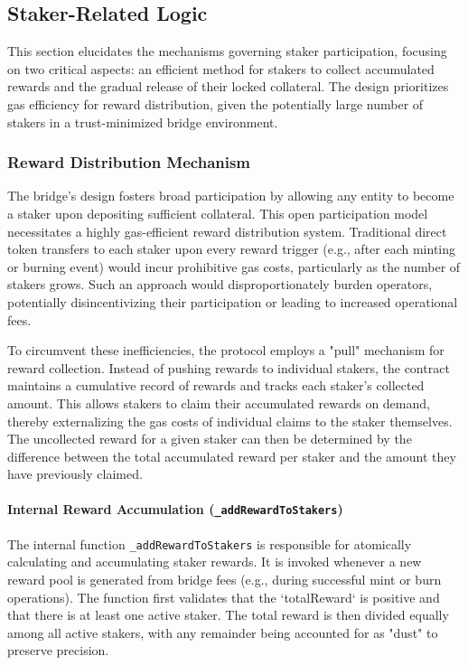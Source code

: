 \documentclass{DESSThesis}
\begin{document}
\subsection{Staker-Related Logic} \label{subsec:staker-related-logic}
This section elucidates the mechanisms governing staker participation, focusing on two critical aspects: an efficient method for stakers to collect accumulated rewards and the gradual release of their locked collateral. The design prioritizes gas efficiency for reward distribution, given the potentially large number of stakers in a trust-minimized bridge environment.

\subsubsection{Reward Distribution Mechanism}
The bridge's design fosters broad participation by allowing any entity to become a staker upon depositing sufficient collateral. This open participation model necessitates a highly gas-efficient reward distribution system. Traditional direct token transfers to each staker upon every reward trigger (e.g., after each minting or burning event) would incur prohibitive gas costs, particularly as the number of stakers grows. Such an approach would disproportionately burden operators, potentially disincentivizing their participation or leading to increased operational fees.

To circumvent these inefficiencies, the protocol employs a "pull" mechanism for reward collection. Instead of pushing rewards to individual stakers, the contract maintains a cumulative record of rewards and tracks each staker's collected amount. This allows stakers to claim their accumulated rewards on demand, thereby externalizing the gas costs of individual claims to the staker themselves. The uncollected reward for a given staker can then be determined by the difference between the total accumulated reward per staker and the amount they have previously claimed.

\paragraph{Internal Reward Accumulation (\texttt{\_addRewardToStakers})}
The internal function \texttt{\_addRewardToStakers} is responsible for atomically calculating and accumulating staker rewards. It is invoked whenever a new reward pool is generated from bridge fees (e.g., during successful mint or burn operations). The function first validates that the `totalReward` is positive and that there is at least one active staker. The total reward is then divided equally among all active stakers, with any remainder being accounted for as "dust" to preserve precision.
\end{document}
